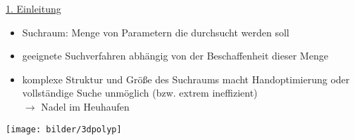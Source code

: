     \begin{frame}
    \underline{1. Einleitung}
        
    \begin{itemize}
      \item Suchraum: Menge von Parametern die durchsucht werden soll
      \item geeignete Suchverfahren abhängig von der Beschaffenheit dieser Menge
      \item komplexe Struktur und Größe des Suchraums macht Handoptimierung oder vollständige Suche
      unmöglich (bzw. extrem ineffizient) \\ $\rightarrow$ Nadel im Heuhaufen
    \end{itemize}
      


  

% 


  \hspace{0.33cm}    
  \texttt{[image: bilder/3dpolyp]}
  \hspace{0.33cm}    

     



    
    

    \end{frame}
    
    
      
